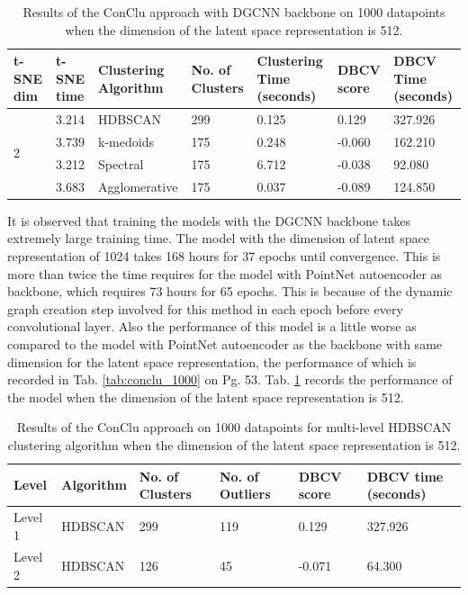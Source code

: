 \begin{table}[H]
  \setlength\extrarowheight{10pt}
  \caption{Results of the ConClu approach with \ac{DGCNN} backbone on 1000 datapoints when the dimension of the latent space representation is 512. }
  \centering
  \begin{tabular}{|p{30pt}|p{50pt}|p{60pt}|p{50pt}|p{50pt}|p{50pt}|p{40pt}|}
    \toprule
    \ac{t-SNE} dim	& \ac{t-SNE} time & Clustering Algorithm & No. of Clusters & Clustering Time (seconds) & \ac{DBCV} score & \ac{DBCV} Time (seconds)\\
    \midrule
    \multirow{4}{30pt}{2}	& 3.214 & \ac{HDBSCAN}	& 299	& 0.125 & 0.129	& 327.926 \\ \cline{2-7} 
    & 3.739 & k-medoids	& 175	& 0.248 & -0.060	& 162.210 \\ \cline{2-7} 
    & 3.212 & Spectral	& 175	& 6.712 & -0.038 & 92.080 \\ \cline{2-7}
    & 3.683 & Agglomerative	& 175	& 0.037 & -0.089	& 124.850 \\ 
    \bottomrule
  \end{tabular}
  \label{tab:dgcnn_512}
\end{table}

It is observed that training the models with the \ac{DGCNN} backbone takes extremely large training time. The model with the dimension of latent space representation of 1024 takes 168 hours for 37 epochs until convergence. This is more than twice the time requires for the model with PointNet autoencoder as backbone, which requires 73 hours for 65 epochs. This is because of the dynamic graph creation step involved for this method in each epoch before every convolutional layer. Also the performance of this model is a little worse as compared to the model with PointNet autoencoder as the backbone with same dimension for the latent space representation, the performance of which is recorded in Tab. \ref{tab:conclu_1000} on Pg. 53. Tab. \ref{tab:dgcnn_512} records the performance of the model when the dimension of the latent space representation is 512. 

\begin{table}[H]
  \setlength\extrarowheight{10pt}
  \caption{Results of the ConClu approach on 1000 datapoints for multi-level \ac{HDBSCAN} clustering algorithm when the dimension of the latent space representation is 512. }
  \centering
  \begin{tabular}{|l|l|l|l|l|l|}
    \toprule
    Level & Algorithm	& No. of Clusters	& No. of Outliers	& DBCV score	& \ac{DBCV} time (seconds)	\\  
    \midrule
    Level 1 & \ac{HDBSCAN} & 299	& 119	& 0.129	& 327.926  \\ \cline{1-6}
    Level 2 & \ac{HDBSCAN} & 126	& 45	& -0.071	& 64.300 \\ 
    \bottomrule
  \end{tabular}
  \label{tab:dgcnn_512_levels}
\end{table}  

